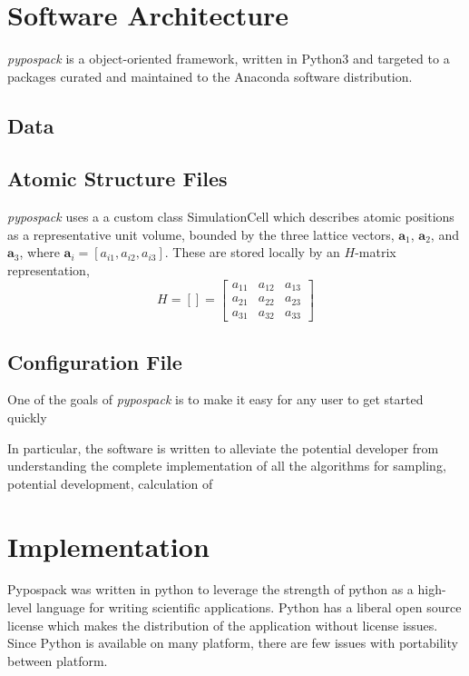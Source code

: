 \section{Software Architecture}

\emph{pypospack} is a object-oriented framework, written in Python3 and targeted to a packages curated and maintained to the Anaconda software distribution.

\subsection{Data}
\subsection{Atomic Structure Files}

\emph{pypospack} uses a a custom class SimulationCell which describes atomic positions as a representative unit volume, bounded by the three lattice vectors, $\bm{a}_1$, $\bm{a}_2$, and $\bm{a}_3$, where $\bm{a}_i=[a_{i1},a_{i2},a_{i3}]$.  These are stored locally by an $H$-matrix representation,
\begin{equation}\label{eq:H-matrix}
     H=\left[\right] =
      \begin{bmatrix}
        a_{11}&a_{12}&a_{13}\\
        a_{21}&a_{22}&a_{23}\\
        a_{31}&a_{32}&a_{33}
      \end{bmatrix}
\end{equation}

\subsection{Configuration File}
One of the goals of \emph{pypospack} is to make it easy for any user to get started quickly

In particular, the software is written to alleviate the potential developer from understanding the complete implementation of all the algorithms for sampling, potential development, calculation of

\section{Implementation}
Pypospack was written in python to leverage the strength of python as a high-level language for writing scientific applications.  Python has a liberal open source license which makes the distribution of the application without license issues.  Since Python is available on many platform, there are few issues with portability between platform.

